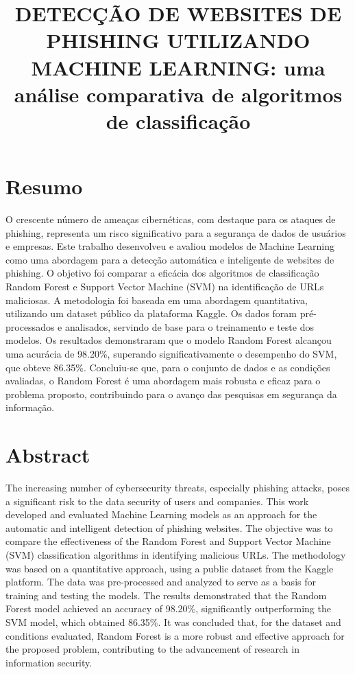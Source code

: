\documentclass[12pt]{article}
\title{DETECÇÃO DE WEBSITES DE PHISHING UTILIZANDO MACHINE LEARNING: uma análise comparativa de algoritmos de classificação}
\begin{document}
\maketitle

\thispagestyle{plain}

\section*{Resumo}
\noindent O crescente número de ameaças cibernéticas, com destaque para os ataques de phishing, representa um risco significativo para a segurança de dados de usuários e empresas. Este trabalho desenvolveu e avaliou modelos de Machine Learning como uma abordagem para a detecção automática e inteligente de websites de phishing. O objetivo foi comparar a eficácia dos algoritmos de classificação Random Forest e Support Vector Machine (SVM) na identificação de URLs maliciosas. A metodologia foi baseada em uma abordagem quantitativa, utilizando um dataset público da plataforma Kaggle. Os dados foram pré-processados e analisados, servindo de base para o treinamento e teste dos modelos. Os resultados demonstraram que o modelo Random Forest alcançou uma acurácia de 98.20\%, superando significativamente o desempenho do SVM, que obteve 86.35\%. Concluiu-se que, para o conjunto de dados e as condições avaliadas, o Random Forest é uma abordagem mais robusta e eficaz para o problema proposto, contribuindo para o avanço das pesquisas em segurança da informação.


\section*{Abstract}
\noindent The increasing number of cybersecurity threats, especially phishing attacks, poses a significant risk to the data security of users and companies. This work developed and evaluated Machine Learning models as an approach for the automatic and intelligent detection of phishing websites. The objective was to compare the effectiveness of the Random Forest and Support Vector Machine (SVM) classification algorithms in identifying malicious URLs. The methodology was based on a quantitative approach, using a public dataset from the Kaggle platform. The data was pre-processed and analyzed to serve as a basis for training and testing the models. The results demonstrated that the Random Forest model achieved an accuracy of 98.20\%, significantly outperforming the SVM model, which obtained 86.35\%. It was concluded that, for the dataset and conditions evaluated, Random Forest is a more robust and effective approach for the proposed problem, contributing to the advancement of research in information security.
\end{document}
